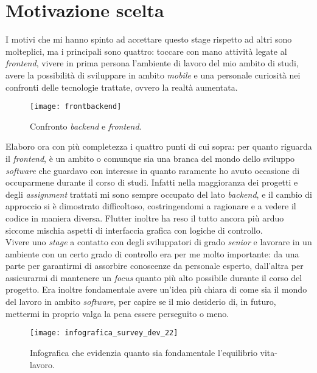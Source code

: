 \section{Motivazione scelta}
I motivi che mi hanno spinto ad accettare questo stage rispetto ad altri sono molteplici, ma i principali sono quattro: toccare con mano attività legate al \textit{frontend}, vivere in prima persona l'ambiente di lavoro del mio ambito di studi, avere la possibilità di sviluppare in ambito \textit{mobile} e una personale curiosità nei confronti delle tecnologie trattate, ovvero la realtà aumentata.
\begin{wrapfigure}{l}{0.7\textwidth}
    \centering
    \texttt{[image: frontbackend]}
    \caption[Confronto \textit{backend} e \textit{frontend}]{Confronto \textit{backend} e \textit{frontend}.\footnotemark}
\end{wrapfigure}
Elaboro ora con più completezza i quattro punti di cui sopra: per quanto riguarda il \textit{frontend}, è un ambito o comunque sia una branca del mondo dello sviluppo \textit{software} che guardavo con interesse in quanto raramente ho avuto occasione di occuparmene durante il corso di studi. Infatti nella maggioranza dei progetti e degli \textit{assignment} trattati mi sono sempre occupato del lato \textit{backend}, e il cambio di approccio si è dimostrato difficoltoso, costringendomi a ragionare e a vedere il codice in maniera diversa. Flutter inoltre ha reso il tutto ancora più arduo siccome mischia aspetti di interfaccia grafica con logiche di controllo.\\
Vivere uno \textit{stage} a contatto con degli sviluppatori di grado \textit{senior} e lavorare in un ambiente con un certo grado di controllo era per me molto importante: da una parte per garantirmi di assorbire conoscenze da personale esperto, dall'altra per assicurarmi di mantenere un \textit{focus} quanto più alto possibile durante il corso del progetto. Era inoltre fondamentale avere un'idea più chiara di come sia il mondo del lavoro in ambito \textit{software}, per capire se il mio desiderio di, in futuro, mettermi in proprio valga la pena essere perseguito o meno.
\begin{figure}[H]
    \centering
    \texttt{[image: infografica\_survey\_dev\_22]}
    \caption[Equilibrio vita-lavoro]{Infografica che evidenzia quanto sia fondamentale l'equilibrio vita-lavoro.\footnotemark}
\end{figure}
